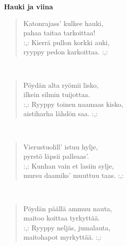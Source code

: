 %
%
\noindent\begin{minipage}{\linewidth}
\vspace{5pt}
\parbox[t]{0.85\linewidth}{\raggedright {\large\bf Hauki ja viina}\\[6pt]}
\begin{verse}
	Katonrajass' kulkee hauki,\\
	pahaa taitaa tarkoittaa!\\
	\hspace{0pt-\widthof{:,: }}:,: Kierrä pullon korkki auki,\\
	ryyppy pedon karkoittaa. :,:\\
\end{verse}
\end{minipage}\\[10pt]
\noindent\begin{minipage}{\linewidth}
\begin{verse}
	Pöydän alta ryömii lisko,\\
	ilkein silmin tuijottaa.\\
	\hspace{0pt-\widthof{:,: }}:,: Ryyppy toinen naamaas kisko,\\
	aistiharha lähdön saa. :,:\\
\end{verse}
\end{minipage}\\[10pt]
\noindent\begin{minipage}{\linewidth}
\begin{verse}
	Vierustuolill' istuu hylje,\\
	pyrstö läpsii palleaas'.\\
	\hspace{0pt-\widthof{:,: }}:,: Kunhan vain et lasiin sylje,\\
	mursu daamiks' muuttuu taas. :,:\\
\end{verse}
\end{minipage}\\[10pt]
\noindent\begin{minipage}{\linewidth}
\begin{verse}
	Pöydän päällä ammuu nauta,\\
	maitoo koittaa tyrkyttää.\\
	\hspace{0pt-\widthof{:,: }}:,: Ryyppy neljäs, jumalauta,\\
	maitohapot myrkyttää. :,:\\
\end{verse}
\end{minipage}\\[10pt]
